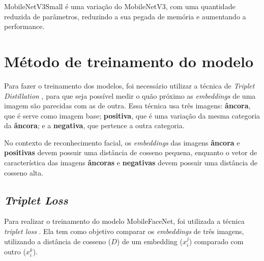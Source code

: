 MobileNetV3Small é uma variação do MobileNetV3, com uma quantidade reduzida de parâmetros, reduzindo a sua pegada de
memória e aumentando a performance.


\section{Método de treinamento do modelo}\label{sec_treinamento_modelo}
Para fazer o treinamento dos modelos, foi necessário utilizar a técnica de \textit{Triplet Distillation}
\cite{triplet_distillation_face_recognition},
para que seja possível medir o quão próximo as \textit{embeddings} de uma imagem são parecidas com as de outra.
Essa técnica usa três imagens: \textbf{âncora}, que é serve como imagem base; \textbf{positiva},
que é uma variação da mesma categoria da \textbf{âncora}; e a \textbf{negativa}, que pertence a outra categoria.

No contexto de reconhecimento facial, os \textit{embeddings} das imagens \textbf{âncora} e \textbf{positivas}
devem possuir uma distância de cosseno pequena, enquanto o vetor de característica das imagens
\textbf{âncoras} e \textbf{negativas} devem possuir uma distância de cosseno alta.

\subsection{\textit{Triplet Loss}}
Para realizar o treinamento do modelo MobileFaceNet, foi utilizada a técnica \textit{triplet loss}
\cite{triplet_distillation_face_recognition}. Ela tem como objetivo comparar os \textit{embeddings} de três imagens,
utilizando a distância de cosseno ($D$) de um embedding ($x_i^j$) comparado com outro ($x_i^k$).

